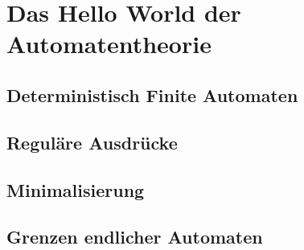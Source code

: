 \chapter{Das Hello World der Automatentheorie}
\section{Deterministisch Finite Automaten}
\section{Reguläre Ausdrücke}
\section{Minimalisierung}
\section{Grenzen endlicher Automaten}
